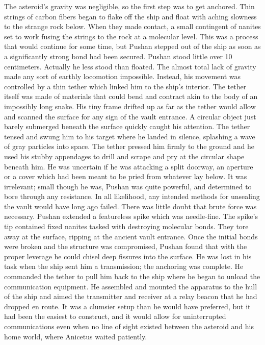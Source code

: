 \documentclass[a4paper]{article}
\begin{document}
The asteroid’s gravity was negligible, so the first step was to get anchored. Thin strings of carbon fibers began to flake off the ship and float with aching slowness to the strange rock below. When they made contact, a small contingent of nanites set to work fusing the strings to the rock at a molecular level. This was a process that would continue for some time, but Pushan stepped out of the ship as soon as a significantly strong bond had been secured.
Pushan stood little over 10 centimeters. Actually he less stood than floated. The almost total lack of gravity made any sort of earthly locomotion impossible. Instead, his movement was controlled by a thin tether which linked him to the ship’s interior. The tether itself was made of materials that could bend and contract akin to the body of an impossibly long snake.
His tiny frame drifted up as far as the tether would allow and scanned the surface for any sign of the vault entrance. A circular object just barely submerged beneath the surface quickly caught his attention. The tether tensed and swung him to his target where he landed in silence, splashing a wave of gray particles into space.
The tether pressed him firmly to the ground and he used his stubby appendages to drill and scrape and pry at the circular shape beneath him. He was uncertain if he was attacking a split doorway, an aperture or a cover which had been meant to be pried from whatever lay below. It was irrelevant; small though he was, Pushan was quite powerful, and determined to bore through any resistance. In all likelihood, any intended methods for unsealing the vault would have long ago failed. There was little doubt that brute force was necessary.
Pushan extended a featureless spike which was needle-fine. The spike’s tip contained fixed nanites tasked with destroying molecular bonds. They tore away at the surface, ripping at the ancient vault entrance. Once the initial bonds were broken and the structure was compromised, Pushan found that with the proper leverage he could chisel deep fissures into the surface.
He was lost in his task when the ship sent him a transmission; the anchoring was complete. He commanded the tether to pull him back to the ship where he began to unload the communication equipment. He assembled and mounted the apparatus to the hull of the ship and aimed the transmitter and receiver at a relay beacon that he had dropped en route. It was a clumsier setup than he would have preferred, but it had been the easiest to construct, and it would allow for uninterrupted communications even when no line of sight existed between the asteroid and his home world, where Anicetus waited patiently.
\end{document}
